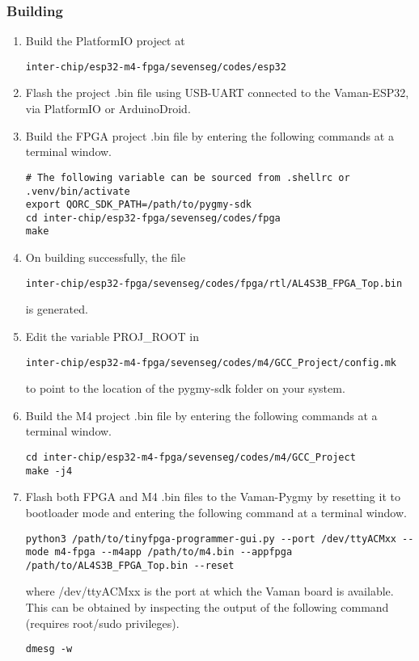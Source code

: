 \subsubsection{Building}
\begin{enumerate}
    \item Build the PlatformIO project at
    \begin{lstlisting}
inter-chip/esp32-m4-fpga/sevenseg/codes/esp32
    \end{lstlisting}
    \item Flash the project .bin file using USB-UART connected to the 
    Vaman-ESP32, via PlatformIO or ArduinoDroid.
    \item Build the FPGA project .bin file by entering the following commands at
    a terminal window.
    \begin{lstlisting}
# The following variable can be sourced from .shellrc or .venv/bin/activate
export QORC_SDK_PATH=/path/to/pygmy-sdk
cd inter-chip/esp32-fpga/sevenseg/codes/fpga
make
    \end{lstlisting}
    \item On building successfully, the file
    \begin{lstlisting}
inter-chip/esp32-fpga/sevenseg/codes/fpga/rtl/AL4S3B_FPGA_Top.bin
    \end{lstlisting}
    is generated.
    \item Edit the variable PROJ\_ROOT in
    \begin{lstlisting}
inter-chip/esp32-m4-fpga/sevenseg/codes/m4/GCC_Project/config.mk
    \end{lstlisting}
    to point to the location of the pygmy-sdk folder on your system.
    \item Build the M4 project .bin file by entering the following commands at a
    terminal window.
    \begin{lstlisting}
cd inter-chip/esp32-m4-fpga/sevenseg/codes/m4/GCC_Project
make -j4
    \end{lstlisting}
    \item Flash both FPGA and M4 .bin files to the Vaman-Pygmy by resetting it
    to bootloader mode and entering the following command at a terminal window.
    \begin{lstlisting}
python3 /path/to/tinyfpga-programmer-gui.py --port /dev/ttyACMxx --mode m4-fpga --m4app /path/to/m4.bin --appfpga /path/to/AL4S3B_FPGA_Top.bin --reset
    \end{lstlisting}
    where /dev/ttyACMxx is the port at which the Vaman board is available. This
    can be obtained by inspecting the output of the following command (requires
    root/sudo privileges).
    \begin{lstlisting}
dmesg -w
    \end{lstlisting}
\end{enumerate}

